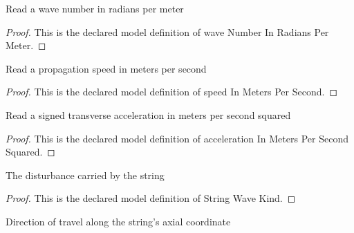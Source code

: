 \begin{definition}
  \label{def:physics:phyx-mini-0240:phyxminiproblems-problemphyxmini0240-wavenumberinradianspermeter}
  Read a wave number in radians per meter
\end{definition}
\begin{proof}
  This is the declared model definition of wave Number In Radians Per Meter.
\end{proof}
\begin{definition}
  \label{def:physics:phyx-mini-0240:phyxminiproblems-problemphyxmini0240-speedinmeterspersecond}
  Read a propagation speed in meters per second
\end{definition}
\begin{proof}
  This is the declared model definition of speed In Meters Per Second.
\end{proof}
\begin{definition}
  \label{def:physics:phyx-mini-0240:phyxminiproblems-problemphyxmini0240-accelerationinmeterspersecondsquared}
  Read a signed transverse acceleration in meters per second squared
\end{definition}
\begin{proof}
  This is the declared model definition of acceleration In Meters Per Second Squared.
\end{proof}
\begin{definition}
  \label{def:physics:phyx-mini-0240:phyxminiproblems-problemphyxmini0240-stringwavekind}
  The disturbance carried by the string
\end{definition}
\begin{proof}
  This is the declared model definition of String Wave Kind.
\end{proof}
\begin{definition}
  \label{def:physics:phyx-mini-0240:phyxminiproblems-problemphyxmini0240-propagationdirection}
  Direction of travel along the string's axial coordinate
\end{definition}
